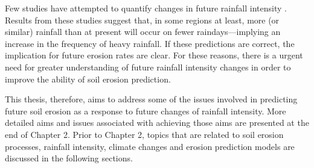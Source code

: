 Few studies have attempted to quantify changes in future rainfall intensity
\citep{karl1995-217,houghton1996-climate,watson1998-517,karl1998-231,
osborn1998-505,osborn2002-1313,osborn2008-changing}. Results from these studies
suggest that, in some regions at least, more (or similar) rainfall than at
present will occur on fewer raindays---implying an increase in the frequency of
heavy rainfall. If these predictions are correct, the implication for future
erosion rates are clear. For these reasons, there is a urgent need for greater
understanding of future rainfall intensity changes in order to improve the
ability of soil erosion prediction.

This thesis, therefore, aims to address some of the issues involved in
predicting future soil erosion as a response to future changes of rainfall
intensity. More detailed aims and issues associated with achieving those aims
are presented at the end of Chapter 2. Prior to Chapter 2, topics that are
related to soil erosion processes, rainfall intensity, climate changes and
erosion prediction models are discussed in the following sections.






